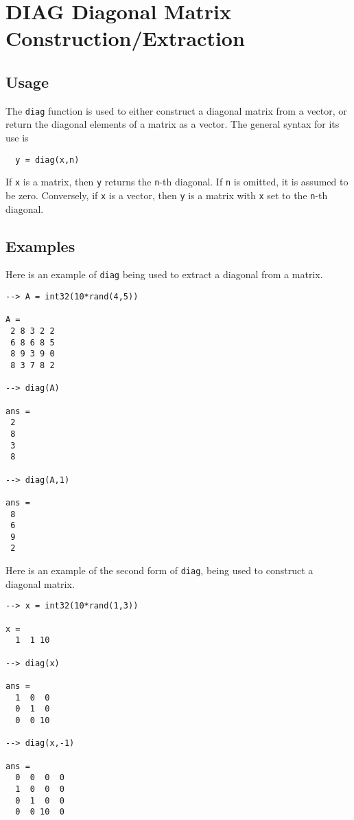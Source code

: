 \section{DIAG Diagonal Matrix Construction/Extraction}

\subsection{Usage}

The \verb|diag| function is used to either construct a 
diagonal matrix from a vector, or return the diagonal
elements of a matrix as a vector.  The general syntax
for its use is
\begin{verbatim}
  y = diag(x,n)
\end{verbatim}
If \verb|x| is a matrix, then \verb|y| returns the \verb|n|-th 
diagonal.  If \verb|n| is omitted, it is assumed to be
zero.  Conversely, if \verb|x| is a vector, then \verb|y|
is a matrix with \verb|x| set to the \verb|n|-th diagonal.
\subsection{Examples}

Here is an example of \verb|diag| being used to extract
a diagonal from a matrix.
\begin{verbatim}
--> A = int32(10*rand(4,5))

A = 
 2 8 3 2 2 
 6 8 6 8 5 
 8 9 3 9 0 
 8 3 7 8 2 

--> diag(A)

ans = 
 2 
 8 
 3 
 8 

--> diag(A,1)

ans = 
 8 
 6 
 9 
 2 
\end{verbatim}
Here is an example of the second form of \verb|diag|, being
used to construct a diagonal matrix.
\begin{verbatim}
--> x = int32(10*rand(1,3))

x = 
  1  1 10 

--> diag(x)

ans = 
  1  0  0 
  0  1  0 
  0  0 10 

--> diag(x,-1)

ans = 
  0  0  0  0 
  1  0  0  0 
  0  1  0  0 
  0  0 10  0 
\end{verbatim}

